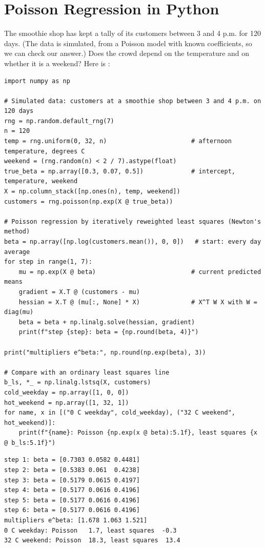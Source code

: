 \section{Poisson Regression in Python}
The smoothie shop has kept a tally of its customers between 3 and 4 p.m. for 120 days. (The data is
simulated, from a Poisson model with known coefficients, so we can check our answer.) Does the crowd depend on
the temperature and on whether it is a weekend? Here is :

\begin{verbatim}
import numpy as np

# Simulated data: customers at a smoothie shop between 3 and 4 p.m. on 120 days
rng = np.random.default_rng(7)
n = 120
temp = rng.uniform(0, 32, n)                       # afternoon temperature, degrees C
weekend = (rng.random(n) < 2 / 7).astype(float)
true_beta = np.array([0.3, 0.07, 0.5])             # intercept, temperature, weekend
X = np.column_stack([np.ones(n), temp, weekend])
customers = rng.poisson(np.exp(X @ true_beta))

# Poisson regression by iteratively reweighted least squares (Newton's method)
beta = np.array([np.log(customers.mean()), 0, 0])   # start: every day average
for step in range(1, 7):
    mu = np.exp(X @ beta)                          # current predicted means
    gradient = X.T @ (customers - mu)
    hessian = X.T @ (mu[:, None] * X)              # X^T W X with W = diag(mu)
    beta = beta + np.linalg.solve(hessian, gradient)
    print(f"step {step}: beta = {np.round(beta, 4)}")

print("multipliers e^beta:", np.round(np.exp(beta), 3))

# Compare with an ordinary least squares line
b_ls, *_ = np.linalg.lstsq(X, customers)
cold_weekday = np.array([1, 0, 0])
hot_weekend = np.array([1, 32, 1])
for name, x in [("0 C weekday", cold_weekday), ("32 C weekend", hot_weekend)]:
    print(f"{name}: Poisson {np.exp(x @ beta):5.1f}, least squares {x @ b_ls:5.1f}")
\end{verbatim}

\begin{verbatim}
step 1: beta = [0.7303 0.0582 0.4481]
step 2: beta = [0.5383 0.061  0.4238]
step 3: beta = [0.5179 0.0615 0.4197]
step 4: beta = [0.5177 0.0616 0.4196]
step 5: beta = [0.5177 0.0616 0.4196]
step 6: beta = [0.5177 0.0616 0.4196]
multipliers e^beta: [1.678 1.063 1.521]
0 C weekday: Poisson   1.7, least squares  -0.3
32 C weekend: Poisson  18.3, least squares  13.4
\end{verbatim}

